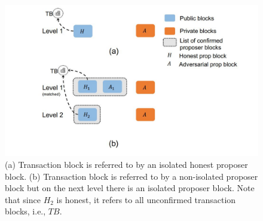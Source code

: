 \begin{center}
	\begin{figure}
		\centering
		\includegraphics[width=0.8\linewidth]{Fig/09/F5}
		\caption{(a) Transaction block is referred to by an isolated honest proposer block. (b) Transaction block is referred to by a non-isolated proposer block but on the next level there is an isolated proposer block. Note that since $H_{2}$ is honest, it refers to all unconfirmed transaction blocks, i.e., $TB$.}
		\label{fig:L9_f5}
	\end{figure}
\end{center}
